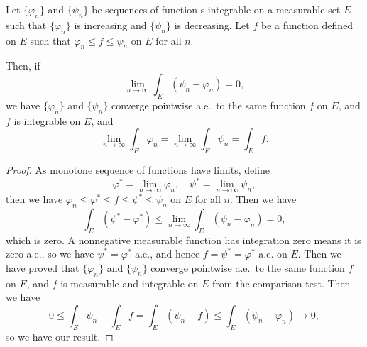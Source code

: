 \documentclass[../main.tex]{subfiles}
\begin{document}
\begin{proposition}{}{}
	Let $\{ \varphi_n \}$ and $\{ \psi_n \}$ be sequences of function s integrable on a measurable set $E$ such that $\{\varphi_n\}$ is increasing and $\{\psi_n\}$ is decreasing. Let $f$ be a function defined on $E$ such that $\varphi_n \leq f \leq \psi_n$ on $E$ for all $n$.

	Then, if
	\begin{equation*}
		\lim_{n \to \infty} \int_E (\psi_n - \varphi_n) = 0,
	\end{equation*}
	we have $\{\varphi_n\}$ and $\{\psi_n\}$ converge pointwise a.e.\ to the same function $f$ on $E$, and $f$ is integrable on $E$, and
	\begin{equation*}
		\lim_{n \to \infty} \int_E \varphi_n = \lim_{n \to \infty} \int_E \psi_n = \int_E f.
	\end{equation*}
\end{proposition}
\begin{proof}
	As monotone sequence of functions have limits, define
	\begin{equation*}
		\varphi^* = \lim_{n \to \infty} \varphi_n, \quad \psi^* = \lim_{n \to \infty} \psi_n,
	\end{equation*}
	then we have $\varphi_n \leq \varphi^* \leq f \leq \psi^* \leq \psi_n$ on $E$ for all $n$. Then we have
	\begin{equation*}
		\int_E (\psi^* - \varphi^*) \leq \lim_{n \to \infty} \int_E (\psi_n - \varphi_n) = 0,
	\end{equation*}
	which is zero. A nonnegative measurable function has integration zero means it is zero a.e., so we have $\psi^* = \varphi^*$ a.e., and hence $f = \psi^* = \varphi^*$ a.e. on $E$. Then we have proved that $\{\varphi_n\}$ and $\{\psi_n\}$ converge pointwise a.e.\ to the same function $f$ on $E$, and $f$ is measurable and integrable on $E$ from the comparison test. Then we have
	\begin{equation*}
		0 \leq \int_E \psi_n - \int_E f = \int_E (\psi_n - f) \leq \int_E (\psi_n - \varphi_n) \to 0,
	\end{equation*}
	so we have our result.
\end{proof}
\end{document}
